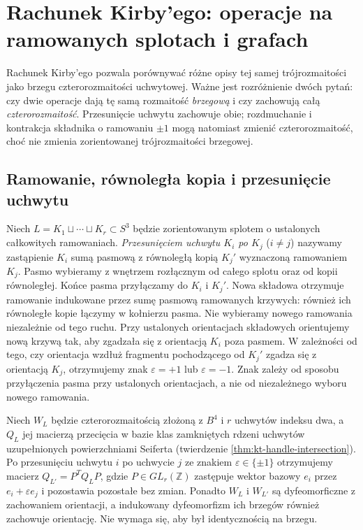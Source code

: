\chapter{Rachunek Kirby'ego: operacje na ramowanych splotach i grafach}
\label{ch:tg-kirby-full}

Rachunek Kirby'ego pozwala porównywać różne opisy
tej samej trójrozmaitości jako brzegu czterorozmaitości
uchwytowej. Ważne jest rozróżnienie dwóch pytań:
czy dwie operacje dają tę samą rozmaitość \emph{brzegową}
i czy zachowują całą \emph{czterorozmaitość}.
Przesunięcie uchwytu zachowuje obie;
rozdmuchanie i kontrakcja składnika o ramowaniu $\pm1$
mogą natomiast zmienić czterorozmaitość,
choć nie zmienia zorientowanej trójrozmaitości brzegowej.

\section{Ramowanie, równoległa kopia i przesunięcie uchwytu}
\label{sec:tg-kirby-slides}

\begin{definicja}
Niech $L=K_1\sqcup\cdots\sqcup K_r\subset S^3$
będzie zorientowanym splotem o ustalonych całkowitych
ramowaniach. \emph{Przesunięciem uchwytu $K_i$ po $K_j$}
($i\ne j$) nazywamy zastąpienie $K_i$ sumą pasmową
z równoległą kopią $K_j'$ wyznaczoną ramowaniem $K_j$.
Pasmo wybieramy z wnętrzem rozłącznym od całego
splotu oraz od kopii równoległej. Końce pasma
przyłączamy do $K_i$ i $K_j'$. Nowa składowa
otrzymuje ramowanie indukowane przez sumę pasmową
ramowanych krzywych: również ich równoległe kopie
łączymy w kołnierzu pasma. Nie wybieramy nowego
ramowania niezależnie od tego ruchu.
Przy ustalonych orientacjach składowych orientujemy
nową krzywą tak, aby zgadzała się z orientacją $K_i$
poza pasmem. W zależności od tego, czy orientacja
wzdłuż fragmentu pochodzącego od $K_j'$ zgadza się
z orientacją $K_j$, otrzymujemy znak $\varepsilon=+1$
lub $\varepsilon=-1$. Znak zależy od sposobu
przyłączenia pasma przy ustalonych orientacjach,
a nie od niezależnego wyboru nowego ramowania.
\end{definicja}

\begin{stwierdzenie}
\label{prop:tg-kirby-congruence}
Niech $W_L$ będzie czterorozmaitością złożoną z $B^4$
i $r$ uchwytów indeksu dwa, a $Q_L$ jej macierzą przecięcia
w bazie klas zamkniętych rdzeni uchwytów uzupełnionych
powierzchniami Seiferta (twierdzenie
\ref{thm:kt-handle-intersection}).
Po przesunięciu uchwytu $i$ po uchwycie $j$ ze znakiem
$\varepsilon\in\{\pm1\}$ otrzymujemy macierz
$Q_{L'}=P^TQ_LP$, gdzie $P\in GL_r(\mathbb Z)$
zastępuje wektor bazowy $e_i$ przez
$e_i+\varepsilon e_j$ i pozostawia pozostałe bez zmian.
Ponadto $W_L$ i $W_{L'}$ są dyfeomorficzne
z zachowaniem orientacji, a indukowany dyfeomorfizm
ich brzegów również zachowuje orientację.
Nie wymaga się, aby był identycznością na brzegu.
\end{stwierdzenie}

